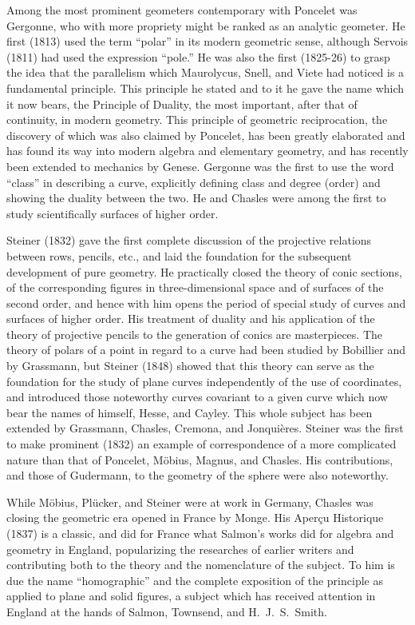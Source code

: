 \documentclass[oneside]{book}
\begin{document}
{Among the most prominent geometers contemporary with Poncelet was
Gergonne, who with more propriety might be ranked as an analytic
geometer. He first (1813) used the term ``polar'' in its modern
geometric sense, although Servois (1811) had used the expression
``pole.'' He was also the first (1825-26) to grasp the idea that
the parallelism which Maurolycus, Snell, and Viete had noticed is a
fundamental principle. This principle he stated and to it he gave
the name which it now bears, the Principle of Duality, the most
important, after that of continuity, in modern geometry. This
principle of geometric reciprocation, the discovery of which was
also claimed by Poncelet, has been greatly elaborated and has found
its way into modern algebra and elementary geometry, and has
recently been extended to mechanics by Genese. Gergonne was the
first to use the word ``class'' in describing a curve, explicitly
defining class and degree (order) and showing the duality between
the two. He and Chasles were among the first to study scientifically
surfaces of higher order.

Steiner (1832) gave the first complete discussion of the projective
relations between rows, pencils, etc., and laid the foundation for
the subsequent development of pure geometry. He practically closed
the theory of conic sections, of the corresponding figures in
three-dimensional space and of surfaces of the second order, and
hence with him opens the period of special study of curves and
surfaces of higher order. His treatment of duality and his
application of the theory of projective pencils to the generation of
conics are masterpieces. The theory of polars of a point in regard
to a curve had been studied by Bobillier and by Grassmann, but
Steiner (1848) showed that this theory can serve as the foundation
for the study of plane curves independently of the use of
coordinates, and introduced those noteworthy curves covariant to a
given curve which now bear the names of himself, Hesse, and Cayley.
This whole subject has been extended by Grassmann, Chasles,
Cremona, and Jonqui\`eres. Steiner was the first to make prominent
(1832) an example of correspondence of a more complicated nature
than that of Poncelet, M\"obius, Magnus, and Chasles. His
contributions, and those of Gudermann, to the geometry of the sphere
were also noteworthy.

While M\"obius, Pl\"ucker, and Steiner were at work in Germany, Chasles
was closing the geometric era opened in France by Monge. His Aper\c{c}u
Historique (1837) is a classic, and did for France what Salmon's
works did for algebra and geometry in England, popularizing the
researches of earlier writers and contributing both to the theory
and the nomenclature of the subject. To him is due the name
``homographic'' and the complete exposition of the principle as
applied to plane and solid figures, a subject which has received
attention in England at the hands of Salmon, Townsend, and
H.~J.~S.~Smith.

}
\end{document}
